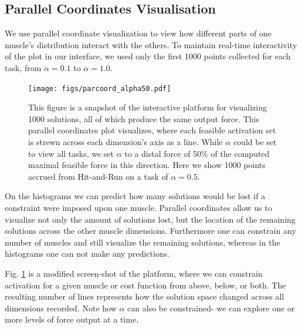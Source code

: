 \subsection*{Parallel Coordinates Visualisation}
We use parallel coordinate visualization to view how different parts of one muscle's distribution interact with the others.
To maintain real-time interactivity of the plot in our interface, we used only the first 1000 points collected for each task, from $\alpha = 0.1$ to $\alpha = 1.0$.

\begin{figure}[htbp]
\centering
\texttt{[image: figs/parcoord\_alpha50.pdf]}
\caption{This figure is a snapshot of the interactive platform for visualizing 1000 solutions, all of which produce the same output force.
This parallel coordinates plot visualizes, where each feasible activation set is strewn across each dimension's axis as a line. 
While $\alpha$ could be set to view all tasks, we set $\alpha$ to a distal force of 50\% of the computed maximal feasible force in this direction. 
Here we show 1000 points accrued from Hit-and-Run on a task of $\alpha=0.5$.}
\label{fig:parcoord_full}
\end{figure}

On the histograms we can predict how many solutions would be lost if a constraint were imposed upon one muscle.
Parallel coordinates allow us to visualize not only the amount of solutions lost, but the location of the remaining solutions across the other muscle dimensions.
Furthermore one can constrain any number of muscles and still visualize the remaining solutions, whereas in the histograms one can not make any predictions.

Fig. \ref{fig:parcoord_full} is a modified screen-shot of the platform, where we can constrain activation for a given muscle or cost function from above, below, or both.
The resulting number of lines represents how the solution space changed across all dimensions recorded.
Note how $\alpha$ can also be constrained- we can explore one or more levels of force output at a time.

